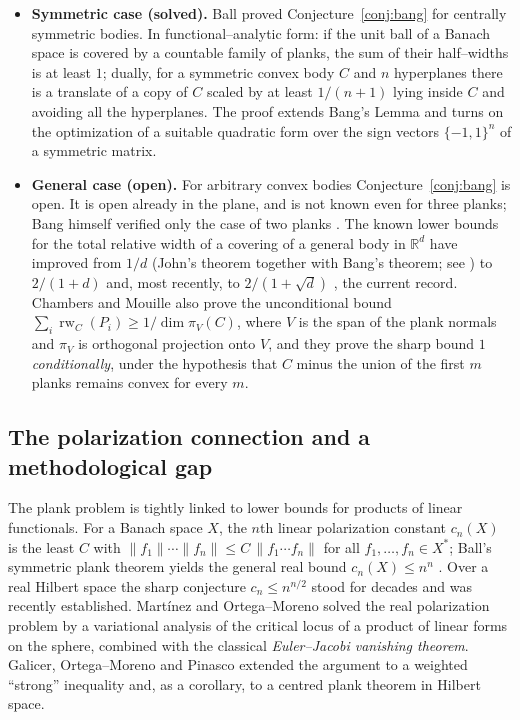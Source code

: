 \documentclass[11pt,reqno]{amsart}
\theoremstyle{plain}
\theoremstyle{definition}
\newcommand{\R}{\mathbb{R}}
\newcommand{\norm}[1]{\lVert #1\rVert}
\newcommand{\relw}{\operatorname{rw}}
\begin{document}
\begin{itemize}
\item \textbf{Symmetric case (solved).} Ball \cite{Ball1991} proved
Conjecture~\ref{conj:bang} for centrally symmetric bodies. In functional--analytic
form: if the unit ball of a Banach space is covered by a countable family of
planks, the sum of their half--widths is at least $1$; dually, for a symmetric
convex body $C$ and $n$ hyperplanes there is a translate of a copy of $C$ scaled
by at least $1/(n+1)$ lying inside $C$ and avoiding all the hyperplanes. The proof
extends Bang's Lemma and turns on the optimization of a suitable quadratic form
over the sign vectors $\{-1,1\}^n$ of a symmetric matrix.

\item \textbf{General case (open).} For arbitrary convex bodies
Conjecture~\ref{conj:bang} is open. It is open already in the plane, and is not
known even for three planks; Bang himself verified only the case of two planks
\cite{Bang1951,KupavskiiPach2017,Verreault2026,BakaevYehudayoff2026}. The known
lower bounds for the total relative width of a covering of a general body in
$\R^d$ have improved from $1/d$ (John's theorem together with Bang's theorem; see
\cite{BezdekLitvak2009,ChambersMouille2016}) to $2/(1+d)$
\cite{ChambersMouille2016} and, most recently, to $2/(1+\sqrt d)$
\cite{BakaevYehudayoff2026}, the current record. Chambers and Mouille
\cite{ChambersMouille2016}
also prove the unconditional bound $\sum_i\relw_C(P_i)\ge 1/\dim\pi_V(C)$, where
$V$ is the span of the plank normals and $\pi_V$ is orthogonal projection onto
$V$, and they prove the sharp bound $1$ \emph{conditionally}, under the hypothesis
that $C$ minus the union of the first $m$ planks remains convex for every $m$.
\end{itemize}

\subsection{The polarization connection and a methodological gap}
\label{subsec:polar}
The plank problem is tightly linked to lower bounds for products of linear
functionals. For a Banach space $X$, the $n$th linear polarization constant
$c_n(X)$ is the least $C$ with $\norm{f_1}\cdots\norm{f_n}\le C\,\norm{f_1\cdots
f_n}$ for all $f_1,\dots,f_n\in X^{*}$; Ball's symmetric plank theorem yields the
general real bound $c_n(X)\le n^{n}$
\cite{BenitezSarantopoulosTonge1998,ReveszSarantopoulos2004}. Over a real Hilbert
space the sharp conjecture $c_n\le n^{n/2}$ stood for decades and was recently
established. Mart\'inez and Ortega--Moreno \cite{MartinezOrtegaMoreno2026} solved
the real polarization problem by a variational analysis of the critical locus of
a product of linear forms on the sphere, combined with the classical
\emph{Euler--Jacobi vanishing theorem}. Galicer, Ortega--Moreno and Pinasco
\cite{GalicerOrtegaPinasco2026} extended the argument to a weighted ``strong''
inequality and, as a corollary, to a centred plank theorem in Hilbert space.
\end{document}
